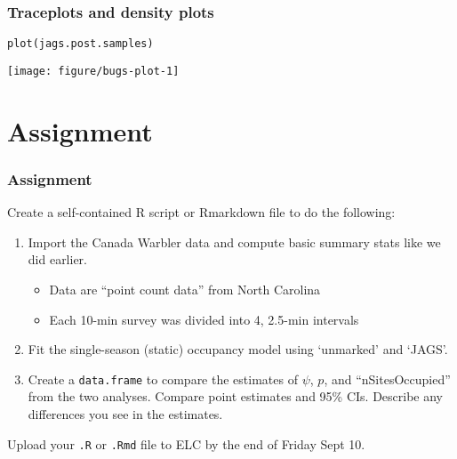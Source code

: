 \documentclass[color=usenames,dvipsnames]{beamer}\usepackage[]{graphicx}\usepackage[]{color}
\makeatletter
\newcommand{\hlstd}[1]{\textcolor[rgb]{0,0,0}{#1}}%
\newcommand{\hlkwd}[1]{\textcolor[rgb]{0.004,0.004,0.506}{#1}}%
\newenvironment{kframe}{%
 \def\at@end@of@kframe{}%
 \ifinner\ifhmode%
  \def\at@end@of@kframe{\end{minipage}}%
  \begin{minipage}{\columnwidth}%
 \fi\fi%
 \def\FrameCommand##1{\hskip\@totalleftmargin \hskip-\fboxsep
 \colorbox{shadecolor}{##1}\hskip-\fboxsep
     \hskip-\linewidth \hskip-\@totalleftmargin \hskip\columnwidth}%
 \MakeFramed {\advance\hsize-\width
   \@totalleftmargin\z@ \linewidth\hsize
   \@setminipage}}%
 {\par\unskip\endMakeFramed%
 \at@end@of@kframe}
\newenvironment{knitrout}{}{} %
\newcommand{\inr}[1]{\colorbox{inlinecolor}{\texttt{#1}}}
\makeatother
\begin{document}
\begin{frame}[fragile]
  \frametitle{Traceplots and density plots}
\begin{knitrout}\footnotesize
{}\color{fgcolor}\begin{kframe}
\begin{alltt}
\hlkwd{plot}\hlstd{(jags.post.samples)}
\end{alltt}
\end{kframe}

{\centering \texttt{[image: figure/bugs-plot-1]} 

}


\end{knitrout}
\end{frame}


\section{Assignment}











\begin{frame}
  \frametitle{Assignment}
  \small
  Create a self-contained R script or Rmarkdown file
  to do the following:
  \begin{enumerate}
    \small
    \item Import the Canada Warbler data and compute basic summary
      stats like we did earlier.
    \begin{itemize}
      \item Data are ``point count data'' from North Carolina
      \item Each 10-min survey was divided into 4, 2.5-min intervals 
    \end{itemize}
    \item Fit the single-season (static) occupancy model using
      `unmarked' and `JAGS'. 
    \item Create a \inr{data.frame} to compare the estimates of
      $\psi$, $p$, and ``nSitesOccupied'' from the two
      analyses. Compare point estimates and 95\% CIs. Describe any
      differences you see in the estimates.
  \end{enumerate}
  Upload your {\tt .R} or {\tt .Rmd} file to ELC by the end of Friday Sept 10. 
\end{frame}
\end{document}
